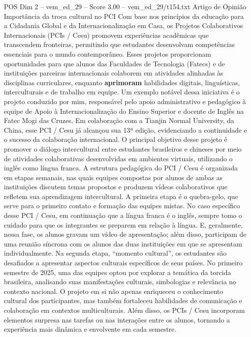 \begin{textsample}{POS Dim 2 – vem\_ed\_29 – Score 3.00 – vem\_ed\_29/t154.txt}  \label{ex:f2_pos_009}
Artigo de Opinião Importância da troca cultural no PCI Com base nos princípios da educação para a Cidadania Global e da Internacionalização em Casa, os Projetos Colaborativos Internacionais (PCIs / Cesu) promovem experiências acadêmicas que transcendem fronteiras, permitindo que estudantes desenvolvam competências essenciais para o mundo contemporâneo.
Esses projetos proporcionam oportunidades para que alunos das Faculdades de Tecnologia (Fatecs) e de instituições parceiras internacionais colaborem em atividades alinhadas às disciplinas curriculares, enquanto \textbf{aprimoram} habilidades digitais, linguísticas, interculturais e de trabalho em equipe.
Um exemplo notável dessa iniciativa é o projeto conduzido por mim, responsável pelo apoio administrativo e pedagógico à equipe de Apoio à Internacionalização do Ensino Superior e docente de Inglês na Fatec Mogi das Cruzes.
Em colaboração com a Tianjin Normal University, da China, esse PCI / Cesu já alcançou sua 13ª edição, evidenciando a continuidade e o sucesso da colaboração internacional.
O principal objetivo desse projeto é promover o diálogo intercultural entre estudantes brasileiros e chineses por meio de atividades colaborativas desenvolvidas em ambientes virtuais, utilizando o inglês como língua franca.
A estrutura pedagógica do PCI / Cesu é organizada em etapas semanais, nas quais equipes compostas por alunos de ambas as instituições discutem temas propostos e produzem vídeos colaborativos que refletem sua aprendizagem intercultural.
A primeira etapa é o quebra-gelo, que serve para o primeiro contato e formação das equipes mistas.
No caso específico desse PCI / Cesu, em continuação que a língua franca é o inglês, sempre tomo o cuidado para que os integrantes se preparem em relação à língua.
E, geralmente, nessa fase, os alunos gravam um vídeo de apresentação; além disso, participam de uma reunião síncrona com os alunos das duas instituições em que se apresentam individualmente.
Na segunda etapa, “momento cultural”, os estudantes são desafiados a apresentar aspectos culturais específicos de seus países.
No primeiro semestre de 2025, uma das equipes optou por explorar a temática da torcida brasileira, analisando suas manifestações culturais, simbologias e relevância no contexto nacional.
O projeto em si não apenas enriqueceu o conhecimento cultural dos participantes, mas também fortaleceu habilidades de comunicação e colaboração em contextos multiculturais.
Além disso, os PCIs / Cesu incorporam elementos surpresa nas tarefas ou nas interações entre os alunos, tornando a experiência mais dinâmica e envolvente em cada semestre.

\end{textsample}
